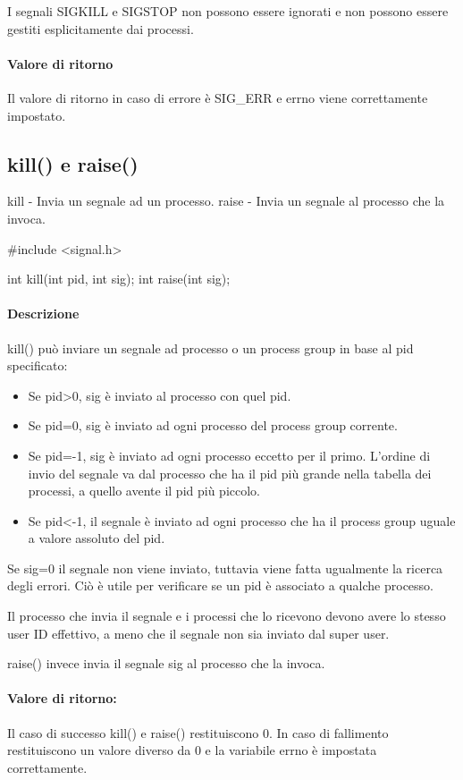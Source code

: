 \documentclass
[10pt,        %
 a4paper,     %
 onecolumn,   %
 fleqn,       %
 oneside,     %
 notitlepage, %
]{article}    %
\begin{document}


I segnali SIGKILL e SIGSTOP non possono essere ignorati e non possono essere gestiti esplicitamente dai processi.

\paragraph{Valore di ritorno}
Il valore di ritorno in caso di errore è SIG\_ERR e errno viene correttamente impostato.

\subsection{kill() e raise()}
kill - Invia un segnale ad un processo.
raise - Invia un segnale al processo che la invoca.
\begin{C}
#include <signal.h>

int kill(int pid, int sig);
int raise(int sig);
\end{C}

\paragraph{Descrizione}
kill() può inviare un segnale ad processo o un process group in base al pid specificato:

\begin{itemize}
    \item Se pid>0, sig è inviato al processo con quel pid.
    \item Se pid=0, sig è inviato ad ogni processo del process group corrente.
    \item Se pid=-1, sig è inviato ad ogni processo eccetto per il primo. L'ordine di invio del segnale va dal processo che ha il pid più grande nella tabella dei processi, a quello avente il pid più piccolo.
    \item Se pid<-1, il segnale è inviato ad ogni processo che ha il process group uguale a valore assoluto del pid.
\end{itemize}

Se sig=0 il segnale non viene inviato, tuttavia viene fatta ugualmente la ricerca degli errori. Ciò è utile per verificare se un pid è associato a qualche processo.

Il processo che invia il segnale e i processi che lo ricevono devono avere lo stesso user ID effettivo, a meno che il segnale non sia inviato dal super user.

raise() invece invia il segnale sig al processo che la invoca.



\paragraph{Valore di ritorno:}
Il caso di successo kill() e raise() restituiscono 0.
In caso di fallimento restituiscono un valore diverso da 0 e la variabile errno è impostata correttamente.
\end{document}
